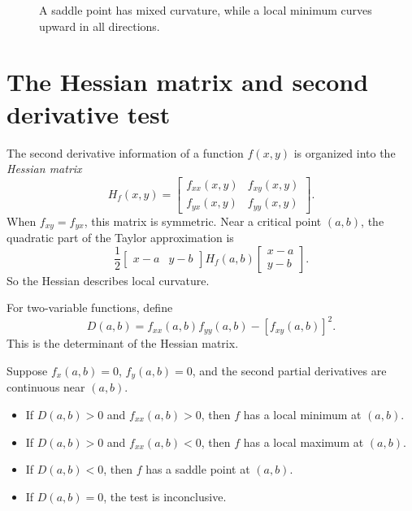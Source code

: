 \documentclass[11pt]{article}
\newcommand{\bmat}[1]{\begin{bmatrix}#1\end{bmatrix}}
\begin{document}
\begin{figure}[H]
\centering
\begin{minipage}{0.48\textwidth}
\centering
{}
\end{minipage}\hfill
\begin{minipage}{0.48\textwidth}
\centering
{}
\end{minipage}
\caption{A saddle point has mixed curvature, while a local minimum curves upward in all directions.}
\end{figure}

\section{The Hessian matrix and second derivative test}

The second derivative information of a function $f(x,y)$ is organized into the \emph{Hessian matrix}
\[
H_f(x,y)=\bmat{f_{xx}(x,y)&f_{xy}(x,y)\\ f_{yx}(x,y)&f_{yy}(x,y)}.
\]
When $f_{xy}=f_{yx}$, this matrix is symmetric. Near a critical point $(a,b)$, the quadratic part of the Taylor approximation is
\[
\frac12\bmat{x-a&y-b}H_f(a,b)\bmat{x-a\\y-b}.
\]
So the Hessian describes local curvature.

For two-variable functions, define
\[
D(a,b)=f_{xx}(a,b)f_{yy}(a,b)-[f_{xy}(a,b)]^2.
\]
This is the determinant of the Hessian matrix.

\begin{tipbox}
Suppose $f_x(a,b)=0$, $f_y(a,b)=0$, and the second partial derivatives are continuous near $(a,b)$.
\begin{itemize}
  \item If $D(a,b)>0$ and $f_{xx}(a,b)>0$, then $f$ has a local minimum at $(a,b)$.
  \item If $D(a,b)>0$ and $f_{xx}(a,b)<0$, then $f$ has a local maximum at $(a,b)$.
  \item If $D(a,b)<0$, then $f$ has a saddle point at $(a,b)$.
  \item If $D(a,b)=0$, the test is inconclusive.
\end{itemize}
\end{tipbox}
\end{document}

